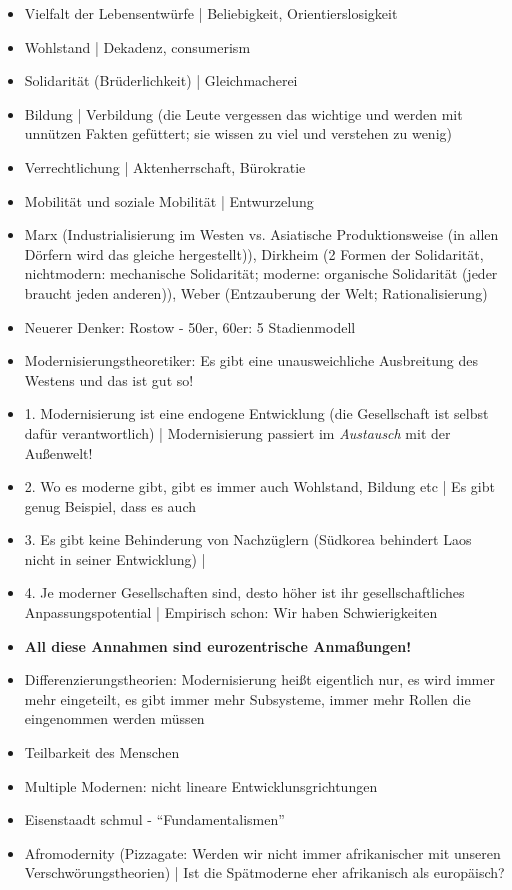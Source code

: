 \documentclass[emulatestandardclasses]{scrartcl}
\begin{document}
\begin{itemize}
  \item Vielfalt der Lebensentwürfe | Beliebigkeit, Orientierslosigkeit
  \item Wohlstand | Dekadenz, consumerism
  \item Solidarität (Brüderlichkeit) | Gleichmacherei
  \item Bildung | Verbildung (die Leute vergessen das wichtige und werden mit unnützen Fakten gefüttert; sie wissen zu viel und verstehen zu wenig)
  \item Verrechtlichung | Aktenherrschaft, Bürokratie
  \item Mobilität und soziale Mobilität | Entwurzelung
  \item Marx (Industrialisierung im Westen vs. Asiatische Produktionsweise (in allen Dörfern wird das gleiche hergestellt)), Dirkheim (2 Formen der Solidarität, nichtmodern: mechanische Solidarität; moderne: organische Solidarität (jeder braucht jeden anderen)), Weber (Entzauberung der Welt; Rationalisierung)
  \item Neuerer Denker: Rostow - 50er, 60er: 5 Stadienmodell 
  \item Modernisierungstheoretiker: Es gibt eine unausweichliche Ausbreitung des Westens und das ist gut so!
  \item 1. Modernisierung ist eine endogene Entwicklung (die Gesellschaft ist selbst dafür verantwortlich) | Modernisierung passiert im \emph{Austausch} mit der Außenwelt!
  \item 2. Wo es moderne gibt, gibt es immer auch Wohlstand, Bildung etc | Es gibt genug Beispiel, dass es auch 
  \item 3. Es gibt keine Behinderung von Nachzüglern (Südkorea behindert Laos nicht in seiner Entwicklung) | 
  \item 4. Je moderner Gesellschaften sind, desto höher ist ihr gesellschaftliches Anpassungspotential | Empirisch schon: Wir haben Schwierigkeiten
  \item \textbf{All diese Annahmen sind eurozentrische Anmaßungen!}
  \item Differenzierungstheorien: Modernisierung heißt eigentlich nur, es wird immer mehr eingeteilt, es gibt immer mehr Subsysteme, immer mehr Rollen die eingenommen werden müssen
  \item Teilbarkeit des Menschen
  \item Multiple Modernen: nicht lineare Entwicklunsgrichtungen
  \item Eisenstaadt schmul - "`Fundamentalismen"'
  \item Afromodernity (Pizzagate: Werden wir nicht immer afrikanischer mit unseren Verschwörungstheorien) | Ist die Spätmoderne eher afrikanisch als europäisch?
\end{itemize}
\end{document}
